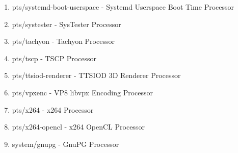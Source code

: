 \documentclass[french]{article}
\begin{document}
\begin{enumerate}
\item pts/systemd-boot-userspace     - Systemd Userspace Boot Time         Processor
\item pts/systester                  - SysTester                           Processor
\item pts/tachyon                    - Tachyon                             Processor
\item pts/tscp                       - TSCP                                Processor
\item pts/ttsiod-renderer            - TTSIOD 3D Renderer                  Processor
\item pts/vpxenc                     - VP8 libvpx Encoding                 Processor
\item pts/x264                       - x264                                Processor
\item pts/x264-opencl                - x264 OpenCL                         Processor
\item system/gnupg                   - GnuPG                               Processor
\end{enumerate}
\end{document}
